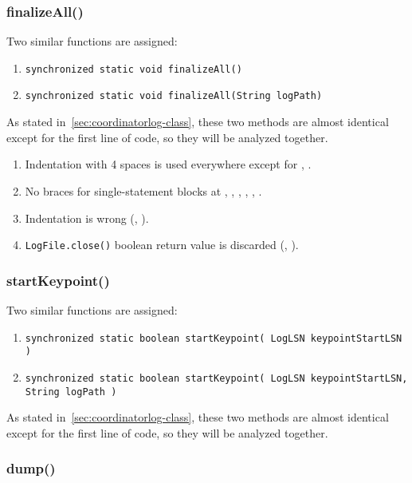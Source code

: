 \subsubsection{finalizeAll()}
Two similar functions are assigned:
\begin{enumerate}
    \item \texttt{\footnotesize synchronized static void finalizeAll()}
    \item \texttt{\footnotesize synchronized static void finalizeAll(String logPath)}
\end{enumerate}

As stated in~\autoref{sec:coordinatorlog-class}, these two methods are almost identical except for the first line of code, so they will be analyzed together.

\begin{enumerate}
    \item {} Indentation with 4 spaces is used everywhere except for , .
    \item {} No braces for single-statement blocks at , , , , , .
    \item {} Indentation is wrong (, ).
    \item {} \texttt{LogFile.close()} boolean return value is discarded (, ).
\end{enumerate}

\subsubsection{startKeypoint()}
Two similar functions are assigned:
\begin{enumerate}
    \item \texttt{\footnotesize synchronized static boolean startKeypoint( LogLSN keypointStartLSN )}
    \item \texttt{\footnotesize synchronized static boolean startKeypoint( LogLSN keypointStartLSN, String logPath )}
\end{enumerate}

As stated in~\autoref{sec:coordinatorlog-class}, these two methods are almost identical except for the first line of code, so they will be analyzed together.

\subsubsection{dump()}

